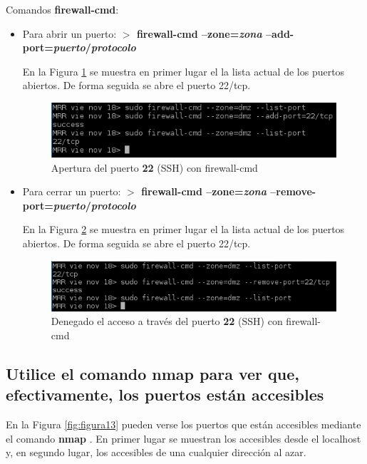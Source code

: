 Comandos \textbf{firewall-cmd}:
\begin{itemize}
	\item Para abrir un puerto: \textbf{$ > $ firewall-cmd --zone=\textit{zona} --add-port=\textit{puerto}/\textit{protocolo}}\cite{enlace13,enlace14}
	
	En la Figura \ref{fig:figura11} se muestra en primer lugar el la lista actual de los puertos abiertos. De forma seguida se abre el puerto 22/tcp.
	\begin{figure}[H] %
		\centering
		\includegraphics[scale=0.8]{figuras/figura11.png} 
		\caption{Apertura del puerto \textbf{22} (SSH) con firewall-cmd} 
		\label{fig:figura11}
	\end{figure}
	
	\item Para cerrar un puerto: \textbf{$ > $ firewall-cmd --zone=\textit{zona} --remove-port=\textit{puerto}/\textit{protocolo}}\cite{enlace13,enlace14}
	
	En la Figura \ref{fig:figura12} se muestra en primer lugar el la lista actual de los puertos abiertos. De forma seguida se abre el puerto 22/tcp.
	\begin{figure}[H] %
		\centering
		\includegraphics[scale=0.9]{figuras/figura12.png} 
		\caption{Denegado el acceso a través del puerto \textbf{22} (SSH) con firewall-cmd} 
		\label{fig:figura12}
	\end{figure}				
\end{itemize}

\subsection{Utilice el comando nmap para ver que,
	efectivamente, los puertos están accesibles} 

En la Figura \ref{fig:figura13} pueden verse los puertos que están accesibles mediante el comando \textbf{nmap} \cite{enlace15}. En primer lugar se muestran los accesibles desde el localhost y, en segundo lugar, los accesibles de una cualquier dirección al azar.

